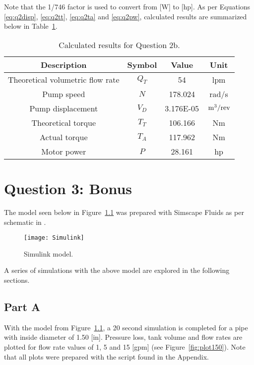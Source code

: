 Note that the 1/746 factor is used to convert from [W] to [hp]. As per Equations \ref{eq:q2disp}, \ref{eq:q2tt}, \ref{eq:q2ta} and \ref{eq:q2pw}, calculated results are summarized below in Table~\ref{tab:q2b}.

\begin{table}[H]
  \centering
  \caption{Calculated results for Question 2b.}
    \begin{tabular}{cccc}
    \toprule
    \textbf{Description} & \textbf{Symbol} & \textbf{Value } & \textbf{Unit} \\
    \midrule
    Theoretical volumetric flow rate & $Q_T$ & 54    & lpm \\
    Pump speed & $N$   & 178.024 & rad/s \\
    Pump displacement & $V_D$ & 3.176E-05 &$\,\mathrm{m^3/rev}$\\
    Theoretical  torque & $T_T$ & 106.166 & Nm \\
    Actual  torque & $T_A$ & 117.962 & Nm \\
    Motor power & $P$   & 28.161 & hp \\
    \bottomrule
    \end{tabular}
  \label{tab:q2b}
\end{table}


\chapter{Question 3: Bonus}
\label{chap:q3}

The model seen below in Figure~\ref{fig:simulink} was prepared with Simscape Fluids \cite{simulink} as per schematic in \cite{assign}.

\begin{figure}[H]
	\centering
	\texttt{[image: Simulink]}
	\caption{Simulink model.}
	\label{fig:simulink}
\end{figure}

A series of simulations with the above model are explored in the following sections.

\section{Part A}
\label{sect:3a}

With the model from Figure~\ref{fig:simulink}, a 20 second simulation is completed for a pipe with inside diameter of 1.50 [in]. Pressure loss, tank volume and flow rates are plotted for flow rate values of 1, 5 and 15 [gpm] (see Figure~\ref{fig:plot150}). Note that all plots were prepared with the \cite{matlab} script found in the Appendix.

